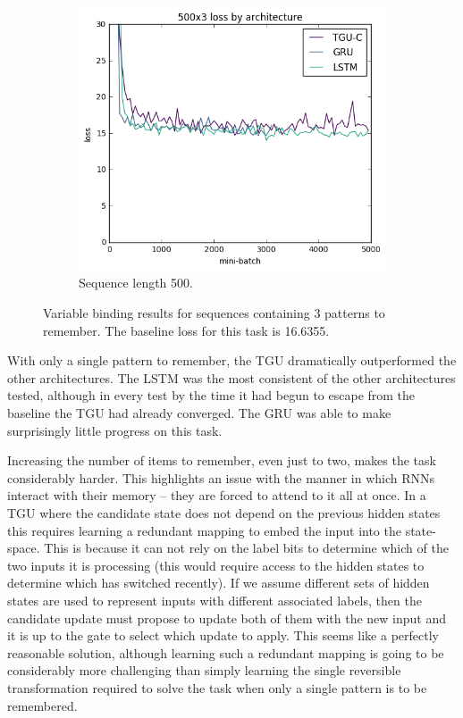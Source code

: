 \begin{figure}[htb]
\begin{subfigure}[t]{0.3\linewidth}
	\includegraphics[width=\linewidth]{exps/vbind/plots/500x3}
	\caption{Sequence length 500.}
\end{subfigure}

\caption[Variable binding results, three patterns]
{Variable binding results for sequences containing \(3\) patterns to remember. The baseline loss for this
task is 16.6355.}
\label{fig:vbindn3}
\end{figure}

With only a single pattern to remember, the TGU dramatically outperformed the other
architectures. The LSTM was the most consistent of the other architectures tested,
although in every test by the time it had begun to escape from the baseline the TGU
had already converged. The GRU was able to make surprisingly little progress on this
task.

Increasing the number of items to remember, even just to two, makes the
task considerably harder. This highlights an issue with the manner
in which RNNs interact with their memory -- they are forced to attend to it all
at once. In a TGU where the candidate state does not
depend on the previous hidden states this requires learning a redundant mapping to embed
the input into the state-space. This is because it can not rely on the label
bits to determine which of the two inputs it is processing (this would require
access to the hidden states to determine which has switched recently). If we
assume different sets of hidden states are used to represent inputs with different
associated labels, then the candidate update must propose to update both of them
with the new input and it is up to the gate to select which update to apply.
This seems like a perfectly reasonable solution, although learning such a redundant
mapping is going to be considerably more challenging than simply learning the single
reversible transformation required to solve the task when only a single pattern
is to be remembered.

